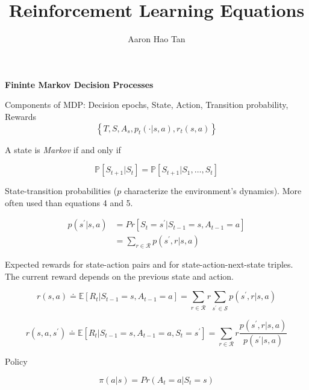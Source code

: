 \documentclass{article}
\author{Aaron Hao Tan}
\title{Reinforcement Learning Equations}
\date{\vspace{-5ex}}
\begin{document}
\maketitle

\noindent
\textbf{Fininte Markov Decision Processes}

\noindent
Components of MDP: {Decision epochs, State, Action, Transition probability,
Rewards}
\begin{equation}
\left\{T, S, A_{s}, p_{t}(\cdot | s, a), r_{t}(s, a)\right\}
\end{equation}

\noindent
A state is \textit{Markov} if and only if 

\begin{equation}
\mathbb{P}\left[S_{t+1} | S_{t}\right]=\mathbb{P}\left[S_{t+1} | S_{1}, \ldots, S_{t}\right]
\end{equation}

\noindent
State-transition probabilities ($p$ characterize the environment's dynamics).
More often used than equations 4 and 5.

\begin{equation}
\begin{aligned}
p(s^{\prime} | s, a) &= Pr [S_{t} = s^{\prime} | S_{t-1}=s, A_{t-1}=a] \\
&=\sum_{r \in \mathcal{R}} p(s^{\prime}, r | s, a)
\end{aligned}
\end{equation}

\noindent
Expected rewards for state-action pairs and for state-action-next-state triples.
The current reward depends on the previous state and action.

\begin{equation}
r(s, a) \doteq \mathbb{E} \left[R_{t} | S_{t-1}=s, A_{t-1}=a\right]=\sum_{r \in \mathcal{R}} r \sum_{s^{\prime} \in \mathcal{S}} p\left(s^{\prime}, r | s, a\right)
\end{equation}

\begin{equation}
r\left(s, a, s^{\prime}\right) \doteq \mathbb{E}\left[R_{t} | S_{t-1}=s, A_{t-1}=a, S_{t}=s^{\prime}\right]=\sum_{r \in \mathcal{R}} r \frac{p\left(s^{\prime}, r | s, a\right)}{p\left(s^{\prime} | s, a\right)}
\end{equation}

\noindent
Policy

\begin{equation}
\pi(a | s)= Pr(A_{t} = a | S_{t}=s)
\end{equation}
\end{document}
